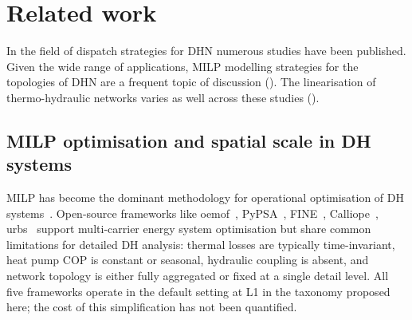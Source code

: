 \documentclass[a4paper,fleqn]{cas-dc}
\begin{document}
\section{Related work}
\label{sec:related_work}

In the field of dispatch strategies for DHN numerous studies have been published. Given the wide range of applications, MILP modelling strategies for the topologies of DHN are a frequent topic of discussion (). The linearisation of thermo-hydraulic networks varies as well across these studies ().

\subsection{MILP optimisation  and spatial scale in DH systems}
\label{sec:rw_milp_topo}

MILP has become the dominant methodology for operational
optimisation  of DH systems~\cite{Fang2016,Guelpa2019review}.
Open-source frameworks like oemof~\cite{Hilpert2018_oemof},
PyPSA~\cite{Brown2018_pypsa}, FINE~\cite{Welder2018_FINE},
Calliope~\cite{Pfenninger2018_calliope},
urbs~\cite{Dorfner2016_urbs} support multi-carrier energy
system optimisation  but share common limitations for detailed DH
analysis: thermal losses are typically time-invariant, heat pump
COP is constant or seasonal, hydraulic coupling is absent, and
network topology is either fully aggregated or fixed at a single
detail level. All five frameworks operate in the default setting at L1 in the taxonomy proposed here; the cost of this simplification has not been
quantified.
\end{document}
